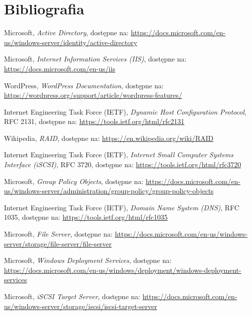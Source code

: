 \newpage
\section{Bibliografia}

\begin{thebibliography}{9}

Microsoft, \textit{Active Directory}, dostępne na: \url{https://docs.microsoft.com/en-us/windows-server/identity/active-directory}

Microsoft, \textit{Internet Information Services (IIS)}, dostępne na: \url{https://docs.microsoft.com/en-us/iis}

WordPress, \textit{WordPress Documentation}, dostępne na: \url{https://wordpress.org/support/article/wordpress-features/}

Internet Engineering Task Force (IETF), \textit{Dynamic Host Configuration Protocol}, RFC 2131, dostępne na: \url{https://tools.ietf.org/html/rfc2131}

Wikipedia, \textit{RAID}, dostępne na: \url{https://en.wikipedia.org/wiki/RAID}

Internet Engineering Task Force (IETF), \textit{Internet Small Computer Systems Interface (iSCSI)}, RFC 3720, dostępne na: \url{https://tools.ietf.org/html/rfc3720}

Microsoft, \textit{Group Policy Objects}, dostępne na: \url{https://docs.microsoft.com/en-us/windows-server/administration/group-policy/group-policy-objects}

Internet Engineering Task Force (IETF), \textit{Domain Name System (DNS)}, RFC 1035, dostępne na: \url{https://tools.ietf.org/html/rfc1035}

Microsoft, \textit{File Server}, dostępne na: \url{https://docs.microsoft.com/en-us/windows-server/storage/file-server/file-server}

Microsoft, \textit{Windows Deployment Services}, dostępne na: \url{https://docs.microsoft.com/en-us/windows/deployment/windows-deployment-services}

Microsoft, \textit{iSCSI Target Server}, dostępne na: \url{https://docs.microsoft.com/en-us/windows-server/storage/iscsi/iscsi-target-server}

\end{thebibliography}

